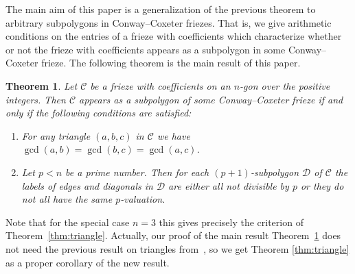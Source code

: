 \documentclass[10pt]{amsart}
\numberwithin{equation}{section}
\newtheorem{theo}{Theorem}[section]
\theoremstyle{definition}
\theoremstyle{remark}
\begin{document}
The main aim of this paper is a generalization of the previous theorem 
to arbitrary subpolygons in Conway--Coxeter friezes. That is, we give 
arithmetic conditions on the entries of a frieze with coefficients
which characterize whether
or not the frieze with coefficients appears as a subpolygon in some 
Conway--Coxeter frieze. 
The following theorem is the main result of this paper.


\begin{theo} \label{thm:mgon}
Let $\mathcal{C}$ be a frieze with coefficients 
on an $n$-gon over the positive integers. Then $\mathcal{C}$ appears as a
subpolygon
of some Conway--Coxeter frieze if and only if the following conditions are
satisfied:
\begin{enumerate}
\item \label{cond:gcd}
For any triangle $(a,b,c)$ in $\mathcal{C}$ we have
$\gcd(a,b)=\gcd(b,c)=\gcd(a,c)$.
\item \label{cond:p+1}
Let $p<n$ be a prime number. Then for each $(p+1)$-subpolygon $\mathcal{D}$
of $\mathcal{C}$ the labels of edges and diagonals in $\mathcal{D}$ are either
all not divisible by $p$ or they do not all have the same $p$-valuation.
\end{enumerate}
\end{theo}


Note that for the special case $n=3$ this gives precisely the criterion of 
Theorem~\ref{thm:triangle}. Actually, our proof of the main result 
Theorem~\ref{thm:mgon}
does not need the previous result on triangles from~\cite{CHJ}, 
so we get Theorem 
\ref{thm:triangle} as a proper corollary of the new result.
\end{document}
